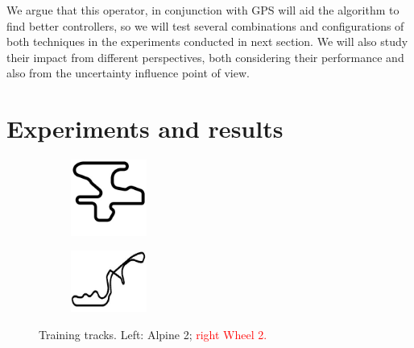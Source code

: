 \documentclass[10pt,journal,compsoc]{IEEEtran}
\begin{document}
We argue that this operator, in conjunction with GPS will aid the
algorithm to find better controllers, so we will test several
combinations and configurations of both techniques in the experiments
conducted in next section. We will also study their impact from
different perspectives, both considering their performance and also
from the uncertainty influence point of view. 
\section{Experiments and results}  
\label{sec:results}

%
\begin{figure}[!ht]	
\centering
\begin{subfigure}[b]{0.15\textwidth}
	\centering
	\includegraphics[width=2.5cm]{fig/alpine2.jpg}
	\label{fig:alpine2}
\end{subfigure}
\hfill
\begin{subfigure}[b]{0.15\textwidth}
	\centering
	\includegraphics[width=2.5cm]{fig/wheel2.jpg}
	\label{fig:wheel2}
\end{subfigure}
\caption{Training tracks. Left: Alpine 2; \textcolor{red}{right Wheel 2.}}
\label{fig:alpine2_wheel2track}
\end{figure}
\end{document}
